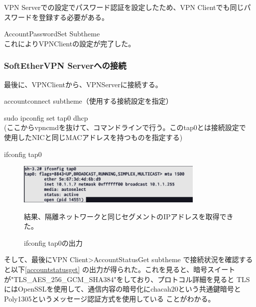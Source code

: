 \documentclass[11pt,a4j,titlepage]{jreport}
\begin{document}
VPN Serverでの設定でパスワード認証を設定したため、VPN Clientでも同じパスワードを登録する必要がある。
\begin{description}
    \setlength{\parskip}{0.0cm} %
    \setlength{\itemsep}{0.0cm} 
    \item[VPN Client\textgreater] AccountPasswordSet Subtheme\\ これによりVPNClientの設定が完了した。
\end{description}


\subsubsection*{SoftEtherVPN Serverへの接続}
最後に、VPNClientから、VPNServerに接続する。
\begin{description}
    \setlength{\parskip}{0.0cm} %
    \setlength{\itemsep}{0.0cm} 
    \item[VPN Client\textgreater] accountconnect subtheme（使用する接続設定を指定）\\ 
    \item[\$] sudo ipconfig set tap0 dhcp \\(ここからvpncmdを抜けて、コマンドラインで行う。このtap0とは接続設定で
    使用したNICと同じMACアドレスを持つものを指定する)
    \item[\$] ifconfig tap0 \\
    \begin{figure}[tbp]
        \centering
        \includegraphics*[width=0.8\textwidth,page=1]{graphs/dhcpsuccess.png}
        \caption{ifconfig tap0の出力}
        \label{tap0の出力}
        結果、隔離ネットワークと同じセグメントのIPアドレスを取得できた。
    \end{figure}

\end{description}
そして、最後にVPN Client\textgreater AccountStatusGet subtheme で接続状況を確認すると以下\ref{accountstatusget}
の出力が得られた。これを見ると、暗号スイートが"TLS\_AES\_256\_GCM\_SHA384"をしており、プロトコル詳細を見ると
TLSにはOpenSSLを使用して、通信内容の暗号化にchacah20という共通鍵暗号とPoly1305というメッセージ認証方式を使用している
ことがわかる。
\end{document}
